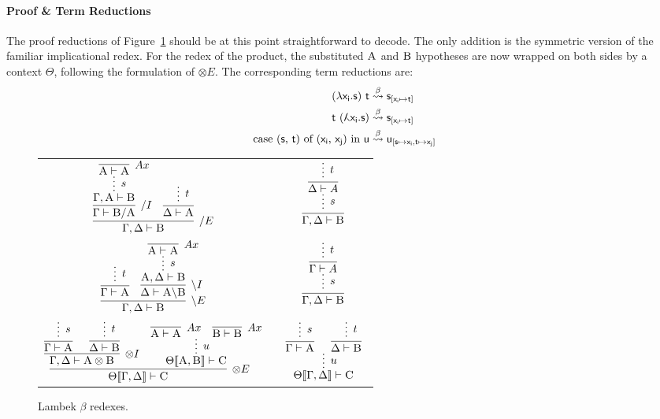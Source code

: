 \paragraph{Proof \& Term Reductions}
The proof reductions of Figure~\ref{figure:lambek_proof_reductions} should be at this point straightforward to decode.
The only addition is the symmetric version of the familiar implicational redex.
For the redex of the product, the substituted $\smallprop{A}$ and $\smallprop{B}$ hypotheses are now wrapped on both sides by a context $\Theta$, following the formulation of $\otimes E$.
The corresponding term reductions are:
\begin{align*}
(\term{\lambda x_i.s})~\term{t} & \overset{\beta}{\leadsto} \term{s}_{[\term{x_i} \mapsto \term{t}]}\\
\term{t}~(\term{\adbmal x_i.s}) & \overset{\beta}{\leadsto} \term{s}_{[\term{x_i} \mapsto \term{t}]}\\
\cterm{case (\smallterm{s}, \smallterm{t}) of (\smallterm{x_i}, \smallterm{x_j}) in \smallterm{u}} & \overset{\beta}{\leadsto} \term{u_{[\term{s} \mapsto \term{x_i}, \term{t} \mapsto \term{x_j}]}}\\
\end{align*}

\begin{figure}
	\centering
	\begin{tabularx}{0.95\textwidth}{@{}ccc@{}}
	$\infer[\divright E]{\Gamma, \Delta \vdash \prop{B}}{
	\infer[\divright I]{\Gamma \vdash \prop{B} \divright \prop{A}}{
		\infer*[s]{\Gamma, \prop{A} \vdash \prop{B}}{
				\infer[Ax]{\prop{A} \vdash \prop{A}}{} 
			}
		}
		&
		\infer{\Delta \vdash \prop{A}}{
			\infer*[t]{}{}
		}
	}$
	&
	\raisebox{20pt}{$\implies$}
	&
	$ 
	\infer[]{\Gamma, \Delta \vdash \prop{B}}{
		\infer*[s]{}{
		\infer[]{\Delta \vdash A}{
			\infer*[t]{}{}
		}}
	}
	$\\[\smallsep]
	$\infer[\divleft E]{\Gamma, \Delta \vdash \prop{B}}{
		\infer{\Gamma \vdash \prop{A}}{
			\infer*[t]{}{}
		}
		&
		\infer[\divleft I]{\Delta \vdash \prop{A} \divleft \prop{B}}{
			\infer*[s]{\prop{A}, \Delta \vdash \prop{B}}{
				\infer[Ax]{\prop{A} \vdash \prop{A}}{} 
			}
		}
	}$
	&
	\raisebox{20pt}{$\implies$}
	&
	$ 
	\infer[]{\Gamma, \Delta \vdash \prop{B}}{
		\infer*[s]{}{
		\infer[]{\Gamma \vdash A}{
			\infer*[t]{}{}
		}}
	}
	$\\[\smallsep]
	$
	\infer[\otimes E]{\Theta\ctx{\Gamma, \Delta} \vdash \prop{C}}{
		\infer[\otimes I]{\Gamma, \Delta \vdash \prop{A} \otimes \prop{B}}{
			\infer[]{\Gamma \vdash \prop{A}}{\infer*[s]{}{}}
			&
			\infer[]{\Delta \vdash \prop{B}}{\infer*[t]{}{}}
		}		
		&
		\infer*[u]{\Theta\ctx{\prop{A}, \prop{B}} \vdash \prop{C}}{
			\infer[Ax]{\prop{A} \vdash \prop{A}}{}
			& 
			\infer[Ax]{\prop{B} \vdash \prop{B}}{}
		}
	}
	$
	&
	\raisebox{20pt}{$\implies$}
	&
	$
	\infer*[u]{\Theta\ctx{\Gamma, \Delta} \vdash \prop{C}}{
		\infer[]{\Gamma \vdash \prop{A}}{
			\infer*[s]{}{}
		}
		&
		\infer[]{\Delta \vdash \prop{B}}{
			\infer*[t]{}{}
		}
	}
	$
	\end{tabularx}
	\caption{Lambek $\beta$ redexes.}
	\label{figure:lambek_proof_reductions}
\end{figure}

